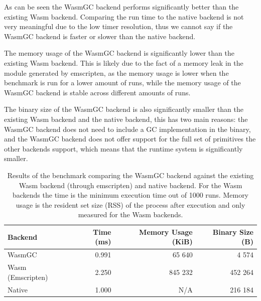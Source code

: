 As can be seen the WasmGC backend performs significantly better than the existing Wasm backend. Comparing the run time to the native backend is not very meaningful due to the low timer resolution, thus we cannot say if the WasmGC backend is faster or slower than the native backend.

The memory usage of the WasmGC backend is significantly lower than the existing Wasm backend. This is likely due to the fact of a memory leak in the module generated by emscripten, as the memory usage is lower when the benchmark is run for a lower amount of runs, while the memory usage of the WasmGC backend is stable across different amounts of runs. 

The binary size of the WasmGC backend is also significantly smaller than the existing Wasm backend and the native backend, this has two main reasons: the WasmGC backend does not need to include a GC implementation in the binary, and the WasmGC backend does not offer support for the full set of primitives the other backends support, which means that the runtime system is significantly smaller.

\begin{table}[t]
    \centering
    \begin{tabular}{|l|r|r|r|}
        \hline
        \textbf{Backend} & \textbf{Time (ms)} & \textbf{Memory Usage (KiB)} & \textbf{Binary Size (B)} \\
        \hline
        WasmGC            & 0.991 &  65 640 &   4 574 \\
        Wasm (Emscripten) & 2.250 & 845 232 & 452 264 \\
        Native            & 1.000 &     N/A & 216 184 \\
        \hline
    \end{tabular}
    \caption{Results of the benchmark comparing the WasmGC backend against the existing Wasm backend (through emscripten) and native backend. For the Wasm backends the time is the minimum execution time out of 1000 runs. Memory usage is the resident set size (RSS) of the process after execution and only measured for the Wasm backends.}
    \label{tab:benchmark_results}
\end{table}
